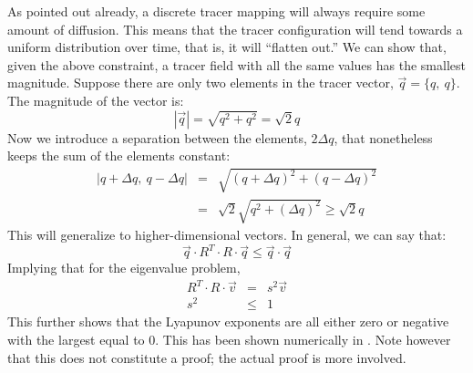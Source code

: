 \documentclass[11pt]{article}
\begin{document}
As pointed out already, a discrete tracer mapping will always require some 
amount of diffusion.  This means that the tracer configuration will 
tend towards a uniform distribution over time, 
that is, it will ``flatten out.''  We can
show that, given the above constraint, a tracer field with all the same values
 has the smallest magnitude.  Suppose there are only two elements in the 
tracer vector, $\vec q=\lbrace q,~q \rbrace$.  The magnitude of the vector is:
\begin{equation}
|\vec q|=\sqrt{q^2+q^2}=\sqrt{2} q
\end{equation}
Now we introduce a separation between the elements, $2\Delta q$, that 
nonetheless keeps the sum of the elements constant:
\begin{eqnarray}
|q+\Delta q,~q-\Delta q| & = & \sqrt{(q+\Delta q)^2+(q-\Delta q)^2} \\
& = & \sqrt{2}\sqrt{q^2+(\Delta q)^2} \ge \sqrt{2} q
\end{eqnarray}
This will generalize to higher-dimensional vectors.  In general, we can
say that:
\begin{equation}
\vec q \cdot R^T \cdot R \cdot \vec q \le \vec q \cdot \vec q
\label{tracer_map_inequality}
\end{equation}
Implying that for the eigenvalue problem,
\begin{eqnarray}
R^T \cdot R \cdot \vec v & = & s^2 \vec v \nonumber\\
s^2 & \le & 1 \label{SV_inequality}
\end{eqnarray}
This further shows that the Lyapunov exponents are all
either zero or negative with the largest equal to 0.  This has been shown
numerically in \citet{Mills2012}.
Note however that this does not constitute a proof; the actual proof is more 
involved.
\end{document}
